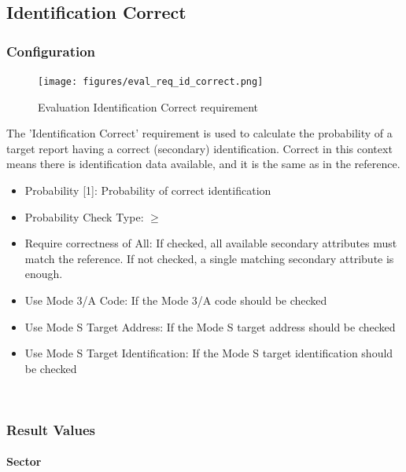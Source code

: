 \subsection{Identification Correct}
\label{sec:eval_req_id_correct} 

\subsubsection{Configuration}

\begin{figure}[H]
    \texttt{[image: figures/eval\_req\_id\_correct.png]}
  \caption{Evaluation Identification Correct requirement}
\end{figure}

The 'Identification Correct' requirement is used to calculate the probability of a target report having a correct (secondary) identification. Correct in this context means there is identification data available, 
and it is the same as in the reference. \\

\begin{itemize}  
\item Probability [1]: Probability of correct identification
\item Probability Check Type: $\geq$
\item Require correctness of All: If checked, all available secondary attributes must match the reference. If not checked, a single matching secondary attribute is enough.
\item Use Mode 3/A Code: If the Mode 3/A code should be checked
\item Use Mode S Target Address: If the Mode S target address should be checked
\item Use Mode S Target Identification: If the Mode S target identification should be checked
\end{itemize}
\ \\

\subsubsection{Result Values}

\paragraph{Sector}

